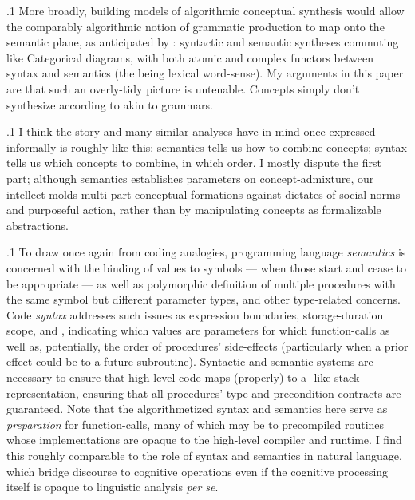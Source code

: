 \documentclass[11pt, twocolumn]{article}
\begin{document}
\p.1{%
More broadly, building
models of algorithmic conceptual synthesis would allow the comparably
algorithmic notion of grammatic production to map onto the semantic
plane, as anticipated by \Boltetal{}: syntactic and semantic syntheses
commuting like Categorical diagrams, with both atomic and complex functors
between syntax and semantics (the  being lexical 
word-sense). \> My arguments 
in this paper are that such an overly-tidy picture is
untenable. \> Concepts simply don't synthesize according to
 akin to  grammars.\<\;
} %

\p.1{%
\:\+I think the story \Boltetal{} and many similar analyses have
in mind \mdash{} once expressed informally \mdash{} is roughly like this:
semantics tells us how to combine concepts;
syntax tells us which concepts to combine, in which
order. \> I mostly dispute the first part; although
semantics establishes parameters on concept-admixture,
our intellect molds multi-part
conceptual formations against dictates
of social norms and purposeful action, rather than
by manipulating concepts as formalizable abstractions.\<\;
} %

\p.1{%
\:\+To draw once again from coding analogies,
programming language \textit{semantics} is concerned with the binding
of values to symbols --- when those  start and
cease to be appropriate --- as well as polymorphic
definition of multiple procedures with the same symbol
but different parameter types, and other type-related
concerns. \> Code \textit{syntax} addresses such issues as
expression boundaries, storage-duration scope, and , indicating
which values are parameters for which function-calls as
well as, potentially, the order of procedures' side-effects
(particularly when a prior effect could be  to
a future subroutine). \> Syntactic and
semantic systems are necessary to ensure that high-level code
maps (properly) to a -like 
stack representation, ensuring that
all procedures' type and precondition contracts are 
guaranteed. \> Note that the algorithmetized syntax and semantics here
serve as \textit{preparation} for function-calls, many of which
may be to precompiled routines whose implementations are
opaque to the high-level compiler and runtime. \> I find this
roughly comparable to the role of syntax and semantics
in natural language, which bridge discourse to cognitive
operations even if the cognitive processing itself
is opaque to linguistic analysis \textit{per se}.\<\;
} %
\end{document}
